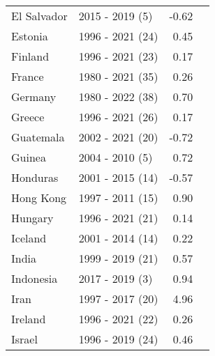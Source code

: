 \begin{table}[pos=h]
{{\begin{tabular}{llrr}
El Salvador & 2015 - 2019 (5) & -0.62\\
\addlinespace
Estonia & 1996 - 2021 (24) & 0.45\\
Finland & 1996 - 2021 (23) & 0.17\\
France & 1980 - 2021 (35) & 0.26\\
Germany & 1980 - 2022 (38) & 0.70\\
Greece & 1996 - 2021 (26) & 0.17\\
\addlinespace
Guatemala & 2002 - 2021 (20) & -0.72\\
Guinea & 2004 - 2010 (5) & 0.72\\
Honduras & 2001 - 2015 (14) & -0.57\\
Hong Kong & 1997 - 2011 (15) & 0.90\\
Hungary & 1996 - 2021 (21) & 0.14\\
\addlinespace
Iceland & 2001 - 2014 (14) & 0.22\\
India & 1999 - 2019 (21) & 0.57\\
Indonesia & 2017 - 2019 (3) & 0.94\\
Iran & 1997 - 2017 (20) & 4.96\\
Ireland & 1996 - 2021 (22) & 0.26\\
\addlinespace
Israel & 1996 - 2019 (24) & 0.46\\ \end{tabular}
}

}
\end{table}
